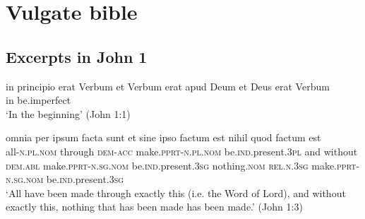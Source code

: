 \documentclass[a4paper, oneside, 12pt]{report}
\newcommand*{\category}[1]{\textsc{#1}}
\newcommand{\translate}[1]{`#1'}
\begin{document}
\section{Vulgate bible}

\subsection{Excerpts in John 1}\label{sec:text.vulgate.john}

\begin{exe}
    \ex\label{ex:text.john.1.1} 
    \gll in principio erat Verbum et Verbum erat apud Deum et Deus erat Verbum \\
    in {} be.\acs{imperfect}  \\
    \glt \translate{In the beginning} (John 1:1)
    
    \ex\label{ex:text.john.1.3}
    \gll omnia per ipsum facta sunt 
    et sine ipso factum est nihil quod factum est \\
    all-\category{n}.\category{pl}.\category{nom} through \category{dem}-\category{acc}
    make.\category{pprt}-\category{n}.\category{pl}.\category{nom} 
    be.\category{ind}.\acs{present}.\category{3pl} 
    and without \category{dem}.\category{abl} 
    make.\category{pprt}-\category{n}.\category{sg}.\category{nom} 
    be.\category{ind}.\acs{present}.\category{3sg}
    nothing.\category{nom}
    \category{rel}.\category{n}.\category{3sg}
    make.\category{pprt}-\category{n}.\category{sg}.\category{nom} 
    be.\category{ind}.\acs{present}.\category{3sg} \\
    \glt \translate{All have been made through exactly this (i.e. the Word of Lord),
    and without exactly this, nothing that has been made has been made.} (John 1:3)
\end{exe}
\end{document}

